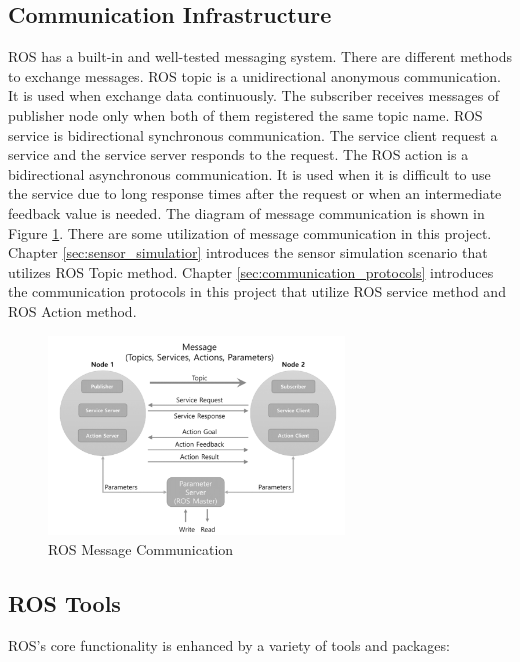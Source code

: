 \subsection{Communication Infrastructure}
ROS has a built-in and well-tested messaging system. There are different methods to exchange messages.  ROS topic is a unidirectional anonymous communication. It is used when exchange data continuously. The subscriber receives messages of publisher node only when both of them registered the same topic name. ROS service is bidirectional synchronous communication. The service client request a service and the service server responds to the request. The ROS action is a bidirectional asynchronous communication. It is used when it is difficult to use the service due to long response times after the request or when an intermediate feedback value is needed.
The diagram of message communication is shown in Figure \ref{fig:ros_message_communication}.  There are some utilization of message communication in this project. Chapter \ref{sec:sensor_simulatior} introduces the sensor simulation scenario that utilizes ROS Topic method. Chapter \ref{sec:communication_protocols} introduces the communication protocols in this project that utilize ROS service method and ROS Action method.   

\begin{figure}
    \centering
    \includegraphics[width = 0.7\textwidth]{content/images/ch2/ros_message_communication.png}
    \caption{ROS Message Communication}
    \label{fig:ros_message_communication}
    \end{figure}
    
\subsection{ROS Tools}
ROS's core functionality is enhanced by a variety of tools and packages:


